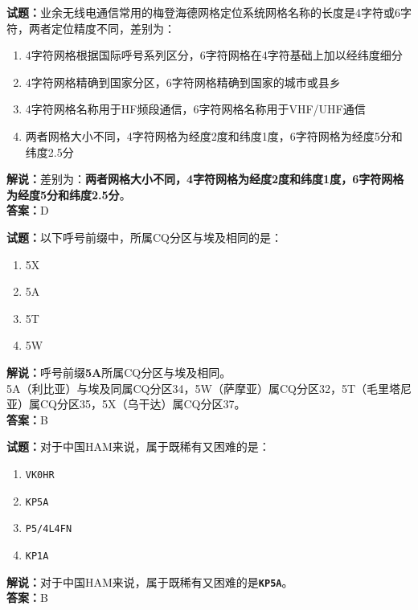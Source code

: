 \documentclass{ctexbook}
\begin{document}
\bigskip


\noindent\textbf{试题：}业余无线电通信常用的梅登海德网格定位系统网格名称的长度是4字符或6字符，两者定位精度不同，差别为：
\begin{enumerate}[leftmargin=3em]
\item 4字符网格根据国际呼号系列区分，6字符网格在4字符基础上加以经纬度细分
\item 4字符网格精确到国家分区，6字符网格精确到国家的城市或县乡
\item 4字符网格名称用于HF频段通信，6字符网格名称用于VHF/UHF通信
\item 两者网格大小不同，4字符网格为经度2度和纬度1度，6字符网格为经度5分和纬度2.5分
\end{enumerate}
\noindent\textbf{解说：}差别为：\textbf{两者网格大小不同，4字符网格为经度2度和纬度1度，6字符网格为经度5分和纬度2.5分}。\\\noindent\textbf{答案：}D


\bigskip

\noindent\textbf{试题：}以下呼号前缀中，所属CQ分区与埃及相同的是：
\begin{enumerate}[leftmargin=3em]
	\item 5X
	\item 5A
	\item 5T
	\item 5W
\end{enumerate}
\noindent\textbf{解说：}呼号前缀\textbf{5A}所属CQ分区与埃及相同。\\
5A（利比亚）与埃及同属CQ分区34，5W（萨摩亚）属CQ分区32，5T（毛里塔尼亚）属CQ分区35，5X（乌干达）属CQ分区37。\\\noindent\textbf{答案：}B

\bigskip


\noindent\textbf{试题：}对于中国HAM来说，属于既稀有又困难的是：
\begin{enumerate}[leftmargin=3em]
	\item \texttt{VK0HR}
	\item \texttt{KP5A}
	\item \texttt{P5/4L4FN} %
	\item \texttt{KP1A}
\end{enumerate}
\noindent\textbf{解说：}对于中国HAM来说，属于既稀有又困难的是\texttt{\textbf{KP5A}}。\\\noindent\textbf{答案：}B
\end{document}
